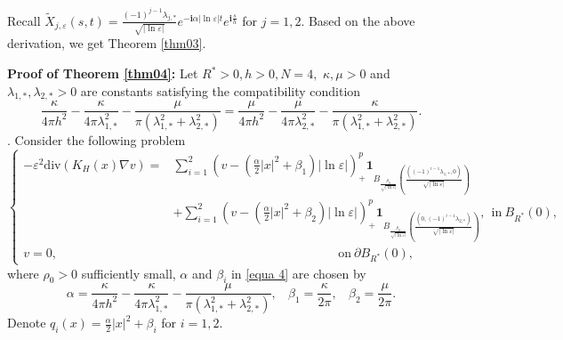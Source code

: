 \documentclass[12pt,reqno]{amsart}
\numberwithin{equation}{section}
\theoremstyle{definition}
\theoremstyle{remark}
\begin{document}
Recall  $ \tilde{X}_{j,\varepsilon}(s,t)=\frac{(-1)^{j-1}\lambda_{j,*}}{\sqrt{|\ln\varepsilon|}}e^{-\mathbf{i}\alpha|\ln\varepsilon|t}e^{\mathbf{i}\frac{s}{h}} 
$ for $ j=1,2 $. Based on the above derivation, we get Theorem \ref{thm03}.







\textbf{Proof of Theorem \ref{thm04}:}
Let $   R^*>0, h>0, N=4, $ $ \kappa,\mu>0 $ and $ \lambda_{1,*},\lambda_{2,*}>0 $ are constants satisfying the compatibility condition
\begin{equation*} 
\frac{\kappa}{4\pi h^2}-\frac{\kappa}{4\pi\lambda_{1,*}^2}-\frac{\mu}{\pi(\lambda_{1,*}^2+\lambda_{2,*}^2)}=\frac{\mu}{4\pi h^2}-\frac{\mu}{4\pi\lambda_{2,*}^2}-\frac{\kappa}{\pi(\lambda_{1,*}^2+\lambda_{2,*}^2)}.
\end{equation*}. 
Consider  the following problem
\begin{equation}\label{equa 4}
	\begin{cases}
		-\varepsilon^2\text{div}(K_H(x)\nabla v)=&\sum_{i=1}^2\left (v-\left(\frac{\alpha}{2}|x|^2+\beta_1 \right)|\ln\varepsilon| \right )^{p}_+\textbf{1}_{B_{\frac{\rho_0}{\sqrt{|\ln\varepsilon|}}}\left (\frac{((-1)^{i-1}\lambda_{1,*},0)}{\sqrt{|\ln\varepsilon|}}\right )}\\
		&+\sum_{i=1}^2\left (v-\left(\frac{\alpha}{2}|x|^2+\beta_2 \right)|\ln\varepsilon| \right )^{p}_+\textbf{1}_{B_{\frac{\rho_0}{\sqrt{|\ln\varepsilon|}}}\left (\frac{(0,(-1)^{i-1}\lambda_{2,*})}{\sqrt{|\ln\varepsilon|}}\right )},\ \ \text{in}\  B_{R^*}(0),\\
		v=0,&\ \ \ \ \ \ \ \ \ \ \ \ \ \ \ \ \ \ \ \ \ \ \ \ \ \ \ \ \ \ \ \ \ \ \ \ \ \ \ \ \ \ \ \ \ \ \ \ \ \ \ \ \ \ \ \ \ \ \ \ \text{on}\ \partial B_{R^*}(0),
	\end{cases}
\end{equation}
where  $ \rho_0>0 $ sufficiently small, %
$ \alpha $ and $ \beta_i $ in \eqref{equa 4} are chosen by
\begin{equation*}
	\alpha=\frac{\kappa}{4\pi h^2}-\frac{\kappa}{4\pi\lambda_{1,*}^2}-\frac{\mu}{\pi(\lambda_{1,*}^2+\lambda_{2,*}^2)},\ \ \ \ \beta_1=\frac{\kappa}{2\pi},\ \ \ \ \beta_2=\frac{\mu}{2\pi}.
\end{equation*}
Denote $ q_i(x)=\frac{\alpha}{2}|x|^2+\beta_i $ for $ i=1,2. $
\end{document}
